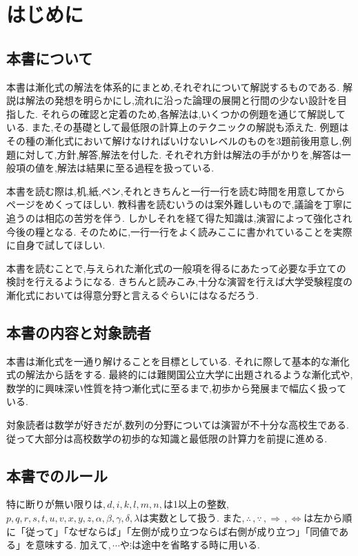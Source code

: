 
  \section{はじめに}
    \subsection{本書について}
      本書は漸化式の解法を体系的にまとめ,それぞれについて解説するものである.
      解説は解法の発想を明らかにし,流れに沿った論理の展開と行間の少ない設計を目指した.
      それらの確認と定着のため,各解法は,いくつかの例題を通じて解説している.
      また,その基礎として最低限の計算上のテクニックの解説も添えた.
      例題はその種の漸化式において解けなければいけないレベルのものを3題前後用意し,例題に対して,方針,解答,解法を付した.
      それぞれ方針は解法の手がかりを,解答は一般項の値を,解法は結果に至る過程を扱っている.

      本書を読む際は,机,紙,ペン,それときちんと一行一行を読む時間を用意してからページをめくってほしい.
      教科書を読むいうのは案外難しいもので,議論を丁寧に追うのは相応の苦労を伴う.
      しかしそれを経て得た知識は,演習によって強化され今後の糧となる.
      そのために,一行一行をよく読みここに書かれていることを実際に自身で試してほしい.

      本書を読むことで,与えられた漸化式の一般項を得るにあたって必要な手立ての検討を行えるようになる.
      きちんと読みこみ,十分な演習を行えば大学受験程度の漸化式においては得意分野と言えるぐらいにはなるだろう.     

    \subsection{本書の内容と対象読者}
      本書は漸化式を一通り解けることを目標としている.
      それに際して基本的な漸化式の解法から話をする.
      最終的には難関国公立大学に出題されるような漸化式や,数学的に興味深い性質を持つ漸化式に至るまで,初歩から発展まで幅広く扱っている.
      
      対象読者は数学が好きだが,数列の分野については演習が不十分な高校生である.
      従って大部分は高校数学の初歩的な知識と最低限の計算力を前提に進める.

    \subsection{本書でのルール}
      特に断りが無い限りは,\,$d,i,k,l,m,n,$は1以上の整数,\,$p,q,r,s,t,u,v,x,y,z,\alpha,\beta,\gamma,\delta,\lambda$は実数として扱う.
      また,\,$\therefore\,,\because\,,\Rightarrow\,,\Leftrightarrow$は左から順に「従って」「なぜならば」「左側が成り立つならば右側が成り立つ」「同値である」を意味する.
      加えて,\,$\cdots$や$\vdots$は途中を省略する時に用いる.

